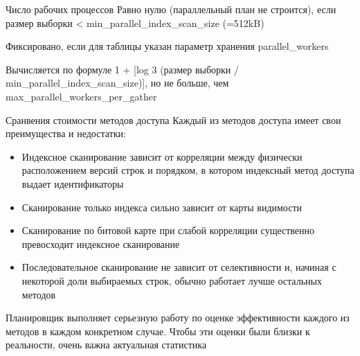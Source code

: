 \documentclass[12pt]{article}
\begin{document}
\begin{nota}{Число рабочих процессов}
    Равно нулю (параллельный план не строится), если размер выборки < min\_parallel\_index\_scan\_size (=512kB)

    Фиксировано, если для таблицы указан параметр хранения parallel\_workers

    Вычисляется по формуле 1 + [log 3 (размер выборки / min\_parallel\_index\_scan\_size)], но не больше, чем max\_parallel\_workers\_per\_gather
\end{nota}

\begin{nota}{Сранвения стоимости методов доступа}
    Каждый из методов доступа имеет свои преимущества и недостатки:

    \begin{itemize}
        \item Индексное сканирование зависит от корреляции между физически расположением версий строк и порядком, в котором индексный метод доступа выдает идентификаторы
        \item Сканирование только индекса сильно зависит от карты видимости 
        \item Сканирование по битовой карте при слабой корреляции существенно превосходит индексное сканирование 
        \item Последовательное сканирование не зависит от селективности и, начиная с некоторой доли выбираемых строк, обычно работает лучше остальных методов 
    \end{itemize}

    Планировщик выполняет серьезную работу по оценке эффективности каждого из методов в каждом конкретном случае. Чтобы эти оценки были близки к реальности, очень важна актуальная статистика 
\end{nota}
\end{document}
